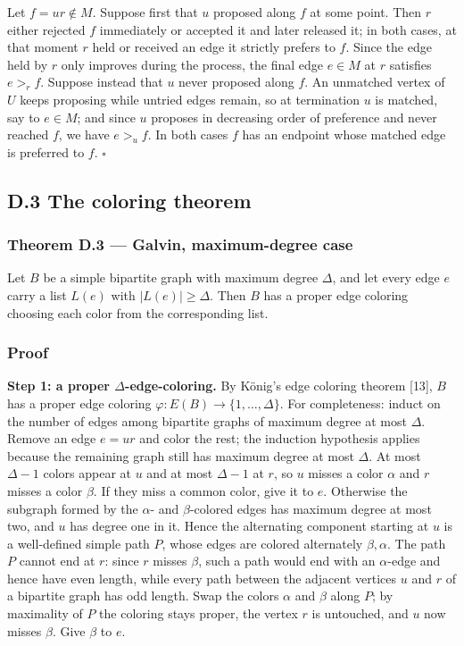\documentclass[english,11pt,a4paper]{article}
\begin{document}
Let \(f=ur\notin M\). Suppose first that \(u\) proposed along \(f\) at
some point. Then \(r\) either rejected \(f\) immediately or accepted it
and later released it; in both cases, at that moment \(r\) held or
received an edge it strictly prefers to \(f\). Since the edge held by
\(r\) only improves during the process, the final edge \(e\in M\) at
\(r\) satisfies \(e>_rf\). Suppose instead that \(u\) never proposed
along \(f\). An unmatched vertex of \(U\) keeps proposing while untried
edges remain, so at termination \(u\) is matched, say to \(e\in M\); and
since \(u\) proposes in decreasing order of preference and never reached
\(f\), we have \(e>_uf\). In both cases \(f\) has an endpoint whose
matched edge is preferred to \(f\). \(\square\)

\subsection{D.3 The coloring theorem}\label{d.3-the-coloring-theorem}

\subsubsection{Theorem D.3 --- Galvin, maximum-degree
case}\label{theorem-d.3-galvin-maximum-degree-case}

Let \(B\) be a simple bipartite graph with maximum degree \(\Delta\),
and let every edge \(e\) carry a list \(L(e)\) with \(|L(e)|\ge\Delta\).
Then \(B\) has a proper edge coloring choosing each color from the
corresponding list.

\subsubsection{Proof}\label{proof-11}

\textbf{Step 1: a proper \(\Delta\)-edge-coloring.} By König's edge
coloring theorem {[}13{]}, \(B\) has a proper edge coloring
\(\varphi:E(B)\to\{1,\ldots,\Delta\}\). For completeness: induct on the
number of edges among bipartite graphs of maximum degree at most
\(\Delta\). Remove an edge \(e=ur\) and color the rest; the induction
hypothesis applies because the remaining graph still has maximum degree
at most \(\Delta\). At most \(\Delta-1\) colors appear at \(u\) and at
most \(\Delta-1\) at \(r\), so \(u\) misses a color \(\alpha\) and \(r\)
misses a color \(\beta\). If they miss a common color, give it to \(e\).
Otherwise the subgraph formed by the \(\alpha\)- and \(\beta\)-colored
edges has maximum degree at most two, and \(u\) has degree one in it.
Hence the alternating component starting at \(u\) is a well-defined
simple path \(P\), whose edges are colored alternately \(\beta,\alpha\).
The path \(P\) cannot end at \(r\): since \(r\) misses \(\beta\), such a
path would end with an \(\alpha\)-edge and hence have even length, while
every path between the adjacent vertices \(u\) and \(r\) of a bipartite
graph has odd length. Swap the colors \(\alpha\) and \(\beta\) along
\(P\); by maximality of \(P\) the coloring stays proper, the vertex
\(r\) is untouched, and \(u\) now misses \(\beta\). Give \(\beta\) to
\(e\).
\end{document}
